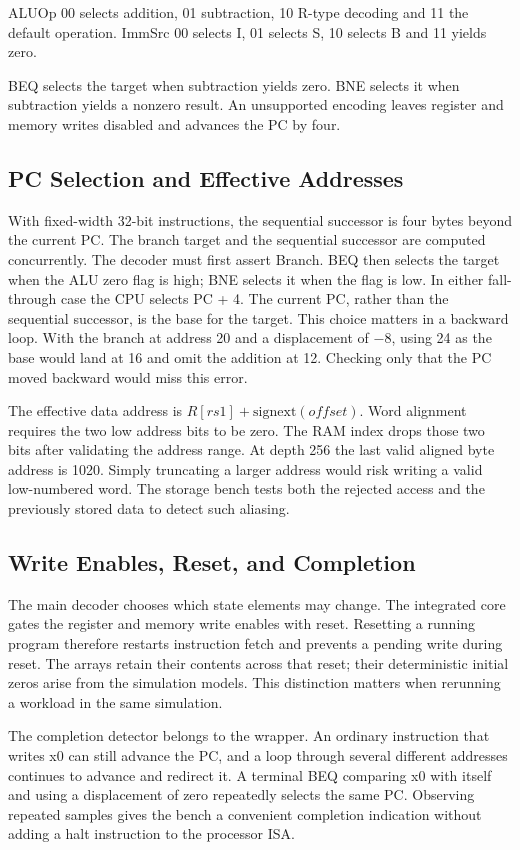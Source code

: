 \documentclass[conference,letterpaper]{IEEEtran}
\begin{document}
ALUOp 00 selects addition, 01 subtraction, 10 R-type decoding and 11 the default operation. ImmSrc 00 selects I, 01 selects S, 10 selects B and 11 yields zero.

BEQ selects the target when subtraction yields zero. BNE selects it when subtraction yields a nonzero result. An unsupported encoding leaves register and memory writes disabled and advances the PC by four.

\subsection{PC Selection and Effective Addresses}
With fixed-width 32-bit instructions, the sequential successor is four bytes beyond the current PC. The branch target and the sequential successor are computed concurrently. The decoder must first assert Branch. BEQ then selects the target when the ALU zero flag is high; BNE selects it when the flag is low. In either fall-through case the CPU selects PC + 4.
The current PC, rather than the sequential successor, is the base for the target. This choice matters in a backward loop. With the branch at address 20 and a displacement of $-8$, using 24 as the base would land at 16 and omit the addition at 12. Checking only that the PC moved backward would miss this error.

The effective data address is $R[rs1]+\mathrm{signext}(offset)$. Word alignment requires the two low address bits to be zero. The RAM index drops those two bits after validating the address range. At depth 256 the last valid aligned byte address is 1020. Simply truncating a larger address would risk writing a valid low-numbered word. The storage bench tests both the rejected access and the previously stored data to detect such aliasing.

\subsection{Write Enables, Reset, and Completion}
The main decoder chooses which state elements may change. The integrated core gates the register and memory write enables with reset. Resetting a running program therefore restarts instruction fetch and prevents a pending write during reset. The arrays retain their contents across that reset; their deterministic initial zeros arise from the simulation models. This distinction matters when rerunning a workload in the same simulation.

The completion detector belongs to the wrapper. An ordinary instruction that writes x0 can still advance the PC, and a loop through several different addresses continues to advance and redirect it. A terminal BEQ comparing x0 with itself and using a displacement of zero repeatedly selects the same PC. Observing repeated samples gives the bench a convenient completion indication without adding a halt instruction to the processor ISA.
\end{document}
